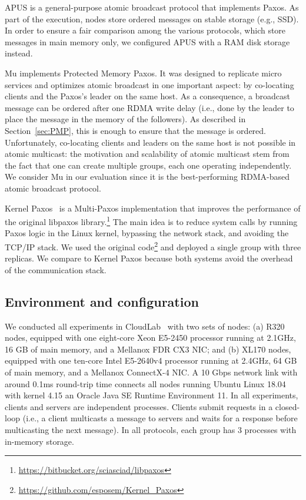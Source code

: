APUS is a general-purpose atomic broadcast protocol that implements Paxos.
As part of the execution, nodes store ordered messages on stable storage (e.g., SSD).
In order to ensure a fair comparison among the various protocols, which store messages in main memory only, we configured APUS with a RAM disk storage instead.

Mu \cite{Aguilera2019} implements Protected Memory Paxos.
It was designed to replicate micro services and optimizes atomic broadcast in one important aspect: by co-locating clients and the Paxos's leader on the same host.
As a consequence, a broadcast message can be ordered after one RDMA write delay (i.e., done by the leader to place the message in the memory of the followers).
As described in Section~\ref{sec:PMP}, this is enough to ensure that the message is ordered.
Unfortunately, co-locating clients and leaders on the same host is not possible in atomic multicast: the motivation and scalability of atomic multicast stem from the fact that one can create multiple groups, each one operating independently.
We consider Mu in our evaluation since it is the best-performing RDMA-based atomic broadcast protocol.

Kernel Paxos~\cite{esposito2018kernel} is a Multi-Paxos implementation that improves the performance of the original libpaxos library.\footnote{\url{https://bitbucket.org/sciasciad/libpaxos}}
The main idea is to reduce system calls by running Paxos logic in the Linux kernel, bypassing the network stack, and avoiding the TCP/IP stack. 
We used the original code\footnote{\url{https://github.com/esposem/Kernel_Paxos}} and deployed a single group with three replicas.
We compare \libname to Kernel Paxos because both systems avoid the overhead of the communication stack.


\subsection{Environment and configuration}
\label{sec:evaluation:setup}

We conducted all experiments in CloudLab~\cite{DuplyakinATC19cloudlab} with two sets of nodes: 
(a) R320 nodes, equipped with one eight-core Xeon E5-2450 processor running at 2.1GHz, 16 GB of main memory, and a Mellanox FDR CX3 NIC; and (b) XL170 nodes, equipped with one ten-core Intel E5-2640v4 processor running at 2.4GHz, 64 GB of main memory, and a Mellanox ConnectX-4 NIC. 
A 10 Gbps network link with around 0.1ms round-trip time connects all nodes running Ubuntu Linux 18.04 with kernel 4.15 an Oracle Java SE Runtime Environment 11. 
In all experiments, clients and servers are independent processes. 
Clients submit requests in a closed-loop (i.e., a client multicasts a message to servers and waits for a response before multicasting the next message). 
In all protocols, each group has 3 processes with in-memory storage.


